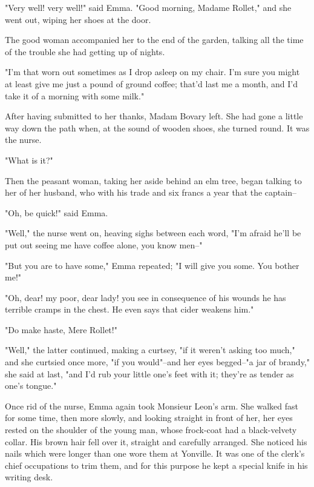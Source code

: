 \documentclass[11pt,twocolumn]{ltugboat}
\begin{document}
"Very well! very well!" said Emma. "Good morning, Madame Rollet," and
she went out, wiping her shoes at the door.

The good woman accompanied her to the end of the garden, talking all the
time of the trouble she had getting up of nights.

"I'm that worn out sometimes as I drop asleep on my chair. I'm sure you
might at least give me just a pound of ground coffee; that'd last me a
month, and I'd take it of a morning with some milk."

After having submitted to her thanks, Madam Bovary left. She had gone a
little way down the path when, at the sound of wooden shoes, she turned
round. It was the nurse.

"What is it?"

Then the peasant woman, taking her aside behind an elm tree, began
talking to her of her husband, who with his trade and six francs a year
that the captain--

"Oh, be quick!" said Emma.

"Well," the nurse went on, heaving sighs between each word, "I'm afraid
he'll be put out seeing me have coffee alone, you know men--"

"But you are to have some," Emma repeated; "I will give you some. You
bother me!"

"Oh, dear! my poor, dear lady! you see in consequence of his wounds he
has terrible cramps in the chest. He even says that cider weakens him."

"Do make haste, Mere Rollet!"

"Well," the latter continued, making a curtsey, "if it weren't asking
too much," and she curtsied once more, "if you would"--and her eyes
begged--"a jar of brandy," she said at last, "and I'd rub your little
one's feet with it; they're as tender as one's tongue."

Once rid of the nurse, Emma again took Monsieur Leon's arm. She walked
fast for some time, then more slowly, and looking straight in front of
her, her eyes rested on the shoulder of the young man, whose frock-coat
had a black-velvety collar. His brown hair fell over it, straight and
carefully arranged. She noticed his nails which were longer than one
wore them at Yonville. It was one of the clerk's chief occupations to
trim them, and for this purpose he kept a special knife in his writing
desk.
\end{document}
